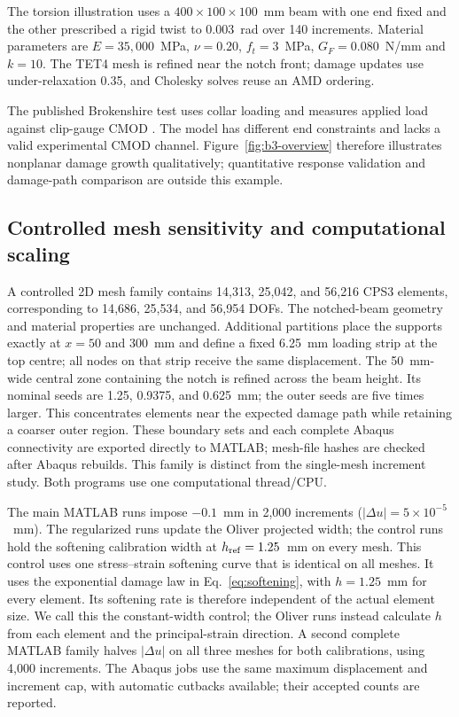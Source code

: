 \documentclass[preprint,11pt,a4paper]{elsarticle}
\begin{document}
The torsion illustration uses a $400\times100\times100$~mm beam with
one end fixed and the other prescribed a rigid twist to $0.003$~rad over
140 increments. Material parameters are $E=35{,}000$~MPa, $\nu=0.20$,
$f_t=3$~MPa, $G_F=0.080$~N/mm and $k=10$. The TET4 mesh is refined
near the notch front; damage updates use under-relaxation 0.35, and
Cholesky solves reuse an AMD ordering.

The published Brokenshire test uses collar loading and measures applied
load against clip-gauge CMOD \citep{brokenshire1996,jefferson_torsion,jefferson2005}.
The model has different end constraints and lacks a valid experimental
CMOD channel. Figure~\ref{fig:b3-overview} therefore illustrates nonplanar
damage growth qualitatively; quantitative response validation and damage-path comparison are outside this example.

\subsection{Controlled mesh sensitivity and computational scaling}

A controlled 2D mesh family contains 14{,}313, 25{,}042, and
56{,}216 CPS3 elements, corresponding to 14{,}686, 25{,}534, and
56{,}954 DOFs. The notched-beam geometry and material properties are
unchanged. Additional partitions place the supports exactly at
$x=50$ and $300$~mm and define a fixed 6.25~mm loading strip at the
top centre; all nodes on that strip receive the same displacement.
The 50~mm-wide central zone containing the notch is refined across
the beam height. Its nominal seeds are 1.25, 0.9375, and 0.625~mm;
the outer seeds are five times larger. This concentrates elements near
the expected damage path while retaining a coarser outer region.
These boundary sets and each complete Abaqus connectivity are exported
directly to MATLAB; mesh-file hashes are checked after Abaqus rebuilds. This family is distinct from the single-mesh increment study. Both programs use one computational thread/CPU.

The main MATLAB runs impose $-0.1$~mm in 2{,}000 increments
($|\Delta u|=5\times10^{-5}$~mm). The regularized runs update the
Oliver projected width; the control runs hold the softening calibration
width at $h_{\rm ref}=1.25$~mm on every mesh. This control uses one
stress--strain softening curve that is identical on all meshes. It uses the exponential damage law in Eq.~\eqref{eq:softening}, with $h=1.25$~mm for every element. Its softening rate is therefore independent of the actual element size. We call this the constant-width control; the Oliver runs instead calculate $h$ from each element and the principal-strain direction.
A second complete MATLAB family halves $|\Delta u|$ on all three
meshes for both calibrations, using 4{,}000 increments.
The Abaqus jobs use the same maximum displacement and increment cap,
with automatic cutbacks available; their accepted counts are reported.
\end{document}
